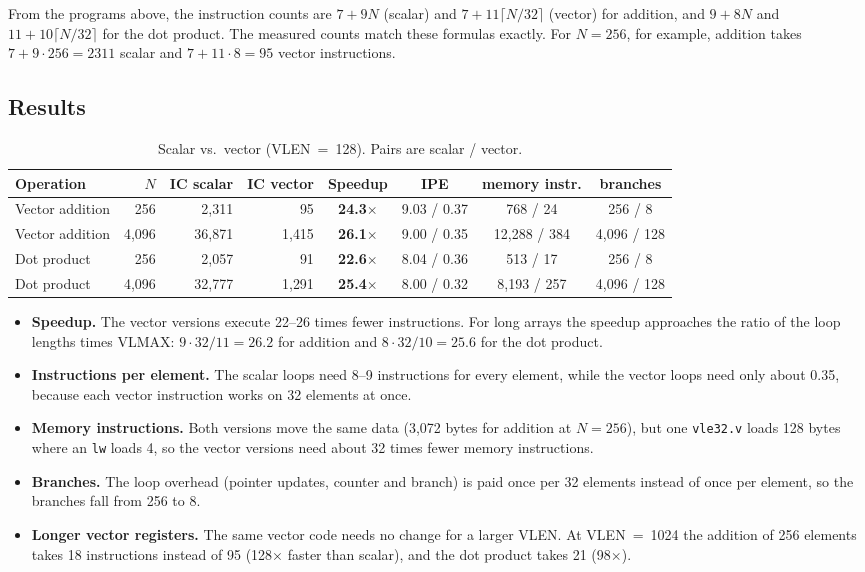 \documentclass[11pt,a4paper]{article}
\newcommand{\code}[1]{\texttt{#1}}
\begin{document}
From the programs above, the instruction counts are $7 + 9N$ (scalar) and
$7 + 11\lceil N/32\rceil$ (vector) for addition, and $9 + 8N$ and $11 + 10\lceil N/32\rceil$
for the dot product. The measured counts match these formulas exactly. For $N=256$, for example,
addition takes $7 + 9\cdot256 = 2311$ scalar and $7 + 11\cdot8 = 95$ vector instructions.

\subsection{Results}

\begin{table}[H]
\centering\small\setlength{\tabcolsep}{5pt}
\caption{Scalar vs.\ vector (VLEN~=~128). Pairs are scalar / vector.}
\label{tab:results}
\begin{tabular}{lrrrcccc}
\toprule
Operation & $N$ & IC scalar & IC vector & \textbf{Speedup} & IPE & memory instr. & branches \\
\midrule
Vector addition & 256     & 2{,}311  & 95      & \textbf{24.3$\times$} & 9.03 / 0.37 & 768 / 24        & 256 / 8 \\
Vector addition & 4{,}096 & 36{,}871 & 1{,}415 & \textbf{26.1$\times$} & 9.00 / 0.35 & 12{,}288 / 384  & 4{,}096 / 128 \\
\addlinespace
Dot product     & 256     & 2{,}057  & 91      & \textbf{22.6$\times$} & 8.04 / 0.36 & 513 / 17        & 256 / 8 \\
Dot product     & 4{,}096 & 32{,}777 & 1{,}291 & \textbf{25.4$\times$} & 8.00 / 0.32 & 8{,}193 / 257   & 4{,}096 / 128 \\
\bottomrule
\end{tabular}
\end{table}

\begin{itemize}
  \item \textbf{Speedup.} The vector versions execute 22--26 times fewer instructions. For long
        arrays the speedup approaches the ratio of the loop lengths times VLMAX:
        $9\cdot32/11 = 26.2$ for addition and $8\cdot32/10 = 25.6$ for the dot product.
  \item \textbf{Instructions per element.} The scalar loops need 8--9 instructions for every
        element, while the vector loops need only about 0.35, because each vector instruction works
        on 32 elements at once.
  \item \textbf{Memory instructions.} Both versions move the same data (3{,}072 bytes for addition
        at $N=256$), but one \code{vle32.v} loads 128 bytes where an \code{lw} loads 4, so the vector
        versions need about 32 times fewer memory instructions.
  \item \textbf{Branches.} The loop overhead (pointer updates, counter and branch) is paid once per
        32 elements instead of once per element, so the branches fall from 256 to 8.
  \item \textbf{Longer vector registers.} The same vector code needs no change for a larger VLEN.
        At VLEN~=~1024 the addition of 256 elements takes 18 instructions instead of 95
        (128$\times$ faster than scalar), and the dot product takes 21 (98$\times$).
\end{itemize}
\end{document}
